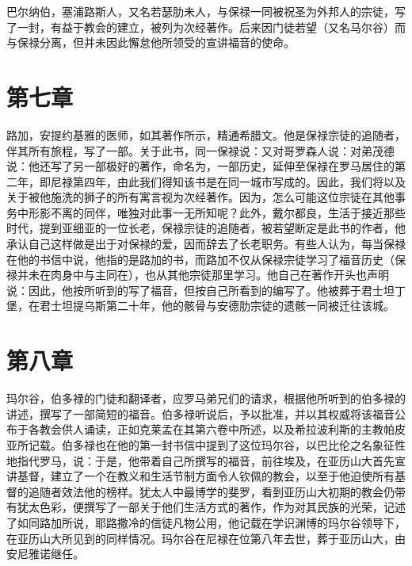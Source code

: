 巴尔纳伯，塞浦路斯人，又名若瑟肋未人，与保禄一同被祝圣为外邦人的宗徒，写了一封，有益于教会的建立，被列为次经著作。后来因门徒若望（又名马尔谷）而与保禄分离，但并未因此懈怠他所领受的宣讲福音的使命。\par


\section{第七章}

路加，安提约基雅的医师，如其著作所示，精通希腊文。他是保禄宗徒的追随者，伴其所有旅程，写了一部。关于此书，同一保禄说：又对哥罗森人说：对弟茂德说：他还写了另一部极好的著作，命名为，一部历史，延伸至保禄在罗马居住的第二年，即尼禄第四年，由此我们得知该书是在同一城市写成的。因此，我们将以及关于被他施洗的狮子的所有寓言视为次经著作。因为，怎么可能这位宗徒在其他事务中形影不离的同伴，唯独对此事一无所知呢？此外，戴尔都良，生活于接近那些时代，提到亚细亚的一位长老，保禄宗徒的追随者，被若望断定是此书的作者，他承认自己这样做是出于对保禄的爱，因而辞去了长老职务。有些人认为，每当保禄在他的书信中说，他指的是路加的书，而路加不仅从保禄宗徒学习了福音历史（保禄并未在肉身中与主同在），也从其他宗徒那里学习。他自己在著作开头也声明说：因此，他按所听到的写了福音，但按自己所看到的编写了。他被葬于君士坦丁堡，在君士坦提乌斯第二十年，他的骸骨与安德肋宗徒的遗骸一同被迁往该城。\par


\section{第八章}

玛尔谷，伯多禄的门徒和翻译者，应罗马弟兄们的请求，根据他所听到的伯多禄的讲述，撰写了一部简短的福音。伯多禄听说后，予以批准，并以其权威将该福音公布于各教会供人诵读，正如克莱孟在其第六卷中所述，以及希拉波利斯的主教帕皮亚所记载。伯多禄也在他的第一封书信中提到了这位玛尔谷，以巴比伦之名象征性地指代罗马，说：于是，他带着自己所撰写的福音，前往埃及，在亚历山大首先宣讲基督，建立了一个在教义和生活节制方面令人钦佩的教会，以至于他迫使所有基督的追随者效法他的榜样。犹太人中最博学的斐罗，看到亚历山大初期的教会仍带有犹太色彩，便撰写了一部关于他们生活方式的著作，作为对其民族的光荣，记述了如同路加所说，耶路撒冷的信徒凡物公用，他记载在学识渊博的玛尔谷领导下，在亚历山大所见到的同样情况。玛尔谷在尼禄在位第八年去世，葬于亚历山大，由安尼雅诺继任。\par

